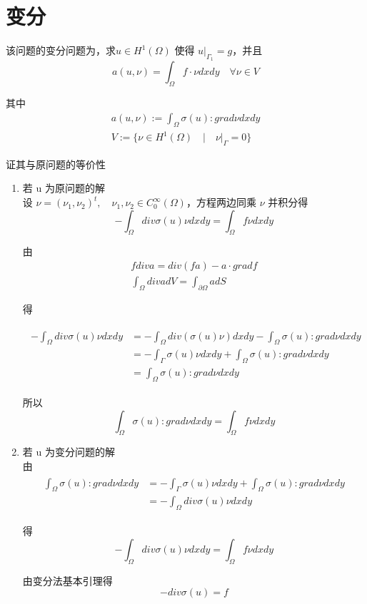 \documentclass[UTF8,titlepage]{ctexart}
\begin{document}
\section{变分}

该问题的变分问题为，求$u \in H^1(\Omega)$ 使得 $u |_{\Gamma_1} = g$，并且
$$
	a(u,\nu) = \int_{\Omega} f \cdot \nu dxdy \quad \forall \nu \in V
$$ 
\par
其中
$$
	\begin{matrix}
		a(u,\nu) := \int_{\Omega} \sigma(u) : grad \nu dxdy 
		\\  
		V := \{ \nu \in H^1(\Omega) \quad | \quad \nu |_{\Gamma} = 0 \}
	\end{matrix}
$$

证其与原问题的等价性

\begin{enumerate}
	\item 若 u 为原问题的解 \\
	设 $\nu = (\nu_1,\nu_2)^t, \quad \nu_1, \nu_2 \in C_0^{\infty}(\Omega)$，方程两边同乘 $\nu$ 并积分得
	$$
		-\int_{\Omega} div \sigma(u) \nu dxdy = \int_{\Omega} f \nu dxdy
	$$
	
	由
	$$
		\begin{matrix}
			f div a = div(fa) - a \cdot grad f \\
			\int_{\Omega} div a dV = \int_{\partial \Omega} a dS
		\end{matrix}
	$$
	
	得
	
	$$
	\begin{matrix}
		\begin{aligned}
		-\int_{\Omega} div \sigma(u) \nu dxdy &= -\int_{\Omega} div(\sigma(u) \nu) dxdy - \int_{\Omega} \sigma(u) : grad \nu dxdy \\
		&= -\int_{\Gamma} \sigma(u) \nu dxdy + \int_{\Omega} \sigma(u) : grad \nu dxdy \\
		&= \int_{\Omega} \sigma(u) : grad \nu dxdy 
		\end{aligned}
	\end{matrix}
	$$
	
	所以
	$$
		\int_{\Omega} \sigma(u) : grad \nu dxdy = \int_{\Omega} f \nu dxdy
	$$
	
	\item 若 u 为变分问题的解 \\
	由
	$$
	\begin{matrix}
		\begin{aligned}
			\int_{\Omega} \sigma(u) : grad \nu dxdy &= -\int_{\Gamma} \sigma(u) \nu dxdy + \int_{\Omega} \sigma(u) : grad \nu dxdy \\
			&= -\int_{\Omega} div \sigma(u) \nu dxdy
		\end{aligned}
	\end{matrix} 
	$$

	得
	$$
		-\int_{\Omega} div \sigma(u) \nu dxdy = \int_{\Omega} f \nu dxdy
	$$
	
	由变分法基本引理得
	$$
		-div \sigma(u) = f
	$$
	
\end{enumerate}
\end{document}

